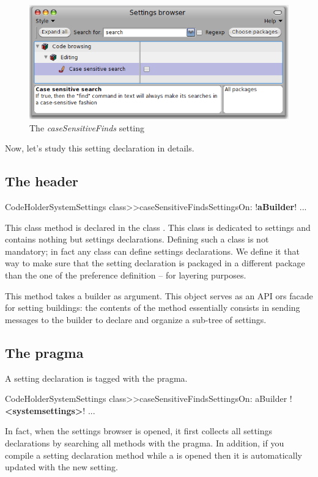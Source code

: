 \documentclass[a4paper,10pt,twoside]{book}
\begin{document}
\begin{figure}[tbh]
\begin{center}
\includegraphics[scale=0.4]{caseSensitiveFinds_setting_declaration1}
\caption{The \textit{caseSensitiveFinds} setting}
\end{center}
\end{figure}

Now, let's study this setting declaration in details. 

\subsection{The header}
\begin{code}{}
CodeHolderSystemSettings class>>caseSensitiveFindsSettingsOn: !\textbf{aBuilder}!
   ...
\end{code}
This class method is declared in the class . This class is dedicated to settings and contains nothing but settings declarations. Defining such a class is not mandatory; in fact any class can define settings declarations. We define it that way to make sure that the setting declaration is packaged in a different package than the one of the preference definition -- for layering purposes.

This method takes a builder as argument. This object serves as an API ors facade for setting buildings: the contents of the method essentially consists in sending messages to the builder to declare and organize a sub-tree of settings.

\subsection{The pragma}
A setting declaration is tagged with the  pragma.
\begin{code}{}
CodeHolderSystemSettings class>>caseSensitiveFindsSettingsOn: aBuilder
	!\textbf{<systemsettings>}!
   ...
\end{code}
In fact, when the settings browser is opened, it first collects all settings declarations by searching all methods with the  pragma. In addition, if you compile a setting declaration method while a \setbrowser is opened then it is automatically updated with the new setting. 
\end{document}

